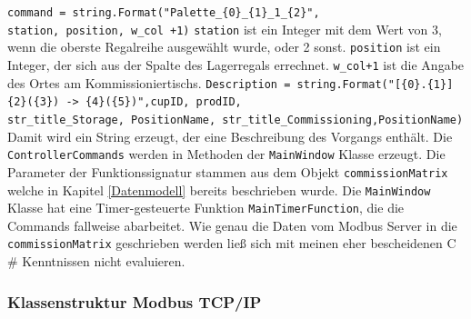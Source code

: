 \newline
\verb|command = string.Format("Palette_{0}_{1}_1_{2}",|\\
\verb|station, position, w_col +1)|
\newline
\newline
\verb|station| ist ein Integer mit dem Wert von 3, wenn die oberste Regalreihe ausgewählt wurde, oder 2 sonst.
\verb|position| ist ein Integer, der sich aus der Spalte des Lagerregals errechnet.
\verb|w_col+1| ist die Angabe des Ortes am Kommissioniertischs.
\newline
\newline
\verb|Description = string.Format("[{0}.{1}] {2}({3}) -> {4}({5})",cupID, prodID, |\\
\verb|str_title_Storage, PositionName, str_title_Commissioning,PositionName)|
\newline
\newline
Damit wird ein String erzeugt, der eine Beschreibung des Vorgangs enthält.
Die \verb|ControllerCommands| werden in Methoden der \verb|MainWindow| Klasse erzeugt.
Die Parameter der Funktionssignatur stammen aus dem Objekt \verb|commissionMatrix| welche in Kapitel \ref{Datenmodell}
bereits beschrieben wurde.
Die \verb|MainWindow| Klasse hat eine Timer-gesteuerte Funktion \verb|MainTimerFunction|, die die Commands
fallweise abarbeitet.
Wie genau die Daten vom Modbus Server in die \verb|commissionMatrix| geschrieben werden ließ sich mit meinen eher
bescheidenen C$\#$ Kenntnissen nicht evaluieren.
\newpage

\subsubsection{Klassenstruktur Modbus TCP/IP}\label{ModbusChapter}

